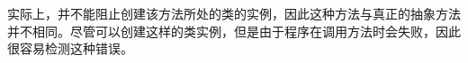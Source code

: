 实际上，并不能阻止创建该方法所处的类的实例，因此这种方法与真正的抽象方法并不相同。尽管可以创建这样的类实例，但是由于程序在调用方法时会失败，因此很容易检测这种错误。









\begin{lstlisting}[language=Java]

\end{lstlisting}





\begin{lstlisting}[language=Java]

\end{lstlisting}





\begin{lstlisting}[language=Java]

\end{lstlisting}









\begin{lstlisting}[language=Java]

\end{lstlisting}





\begin{lstlisting}[language=Java]

\end{lstlisting}





\begin{lstlisting}[language=Java]

\end{lstlisting}
